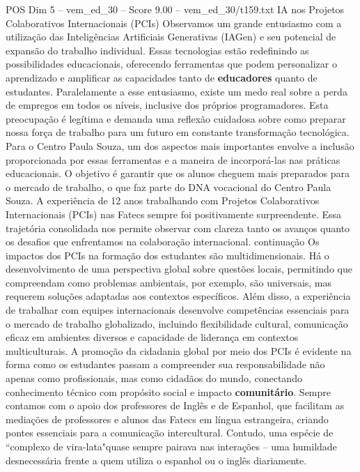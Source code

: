 \begin{textsample}{POS Dim 5 – vem\_ed\_30 – Score 9.00 – vem\_ed\_30/t159.txt}  \label{ex:f5_pos_031}
IA nos Projetos Colaborativos Internacionais (PCIs) Observamos um grande entusiasmo com a utilização das Inteligências Artificiais Generativas (IAGen) e seu potencial de expansão do trabalho individual.
Essas tecnologias estão redefinindo as possibilidades educacionais, oferecendo ferramentas que podem personalizar o aprendizado e amplificar as capacidades tanto de \textbf{educadores} quanto de estudantes.
Paralelamente a esse entusiasmo, existe um medo real sobre a perda de empregos em todos os níveis, inclusive dos próprios programadores.
Esta preocupação é legítima e demanda uma reflexão cuidadosa sobre como preparar nossa força de trabalho para um futuro em constante transformação tecnológica.
Para o Centro Paula Souza, um dos aspectos mais importantes envolve a inclusão proporcionada por essas ferramentas e a maneira de incorporá-las nas práticas educacionais.
O objetivo é garantir que os alunos cheguem mais preparados para o mercado de trabalho, o que faz parte do DNA vocacional do Centro Paula Souza.
A experiência de 12 anos trabalhando com Projetos Colaborativos Internacionais (PCIs) nas Fatecs sempre foi positivamente surpreendente.
Essa trajetória consolidada nos permite observar com clareza tanto os avanços quanto os desafios que enfrentamos na colaboração internacional. continuação Os impactos dos PCIs na formação dos estudantes são multidimensionais.
Há o desenvolvimento de uma perspectiva global sobre questões locais, permitindo que compreendam como problemas ambientais, por exemplo, são universais, mas requerem soluções adaptadas aos contextos específicos.
Além disso, a experiência de trabalhar com equipes internacionais desenvolve competências essenciais para o mercado de trabalho globalizado, incluindo flexibilidade cultural, comunicação eficaz em ambientes diversos e capacidade de liderança em contextos multiculturais.
A promoção da cidadania global por meio dos PCIs é evidente na forma como os estudantes passam a compreender sua responsabilidade não apenas como profissionais, mas como cidadãos do mundo, conectando conhecimento técnico com propósito social e impacto \textbf{comunitário}.
Sempre contamos com o apoio dos professores de Inglês e de Espanhol, que facilitam as mediações de professores e alunos das Fatecs em língua estrangeira, criando pontes essenciais para a comunicação intercultural.
Contudo, uma espécie de “complexo de vira-lata"quase sempre pairava nas interações – uma humildade desnecessária frente a quem utiliza o espanhol ou o inglês diariamente.

\end{textsample}
